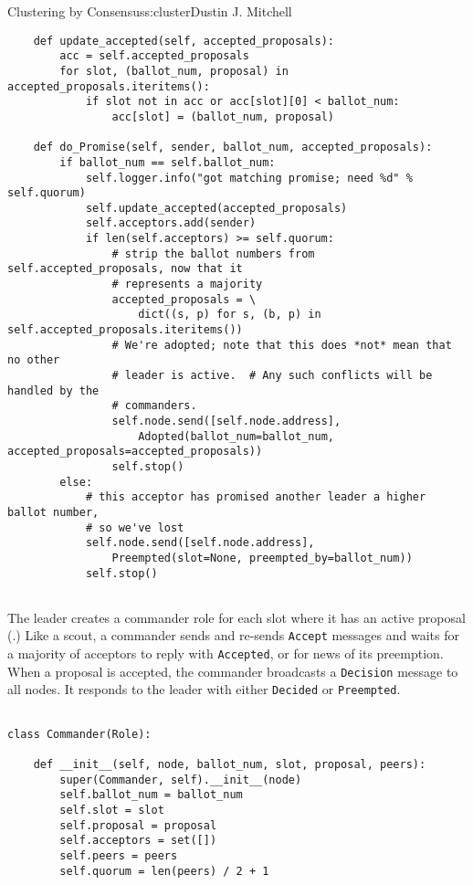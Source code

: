 \begin{aosachapter}{Clustering by Consensus}{s:cluster}{Dustin J. Mitchell}
\begin{verbatim}
    def update_accepted(self, accepted_proposals):
        acc = self.accepted_proposals
        for slot, (ballot_num, proposal) in accepted_proposals.iteritems():
            if slot not in acc or acc[slot][0] < ballot_num:
                acc[slot] = (ballot_num, proposal)

    def do_Promise(self, sender, ballot_num, accepted_proposals):
        if ballot_num == self.ballot_num:
            self.logger.info("got matching promise; need %d" % self.quorum)
            self.update_accepted(accepted_proposals)
            self.acceptors.add(sender)
            if len(self.acceptors) >= self.quorum:
                # strip the ballot numbers from self.accepted_proposals, now that it
                # represents a majority
                accepted_proposals = \ 
                    dict((s, p) for s, (b, p) in self.accepted_proposals.iteritems())
                # We're adopted; note that this does *not* mean that no other
                # leader is active.  # Any such conflicts will be handled by the
                # commanders.
                self.node.send([self.node.address],
                    Adopted(ballot_num=ballot_num, accepted_proposals=accepted_proposals))
                self.stop()
        else:
            # this acceptor has promised another leader a higher ballot number,
            # so we've lost
            self.node.send([self.node.address], 
                Preempted(slot=None, preempted_by=ballot_num))
            self.stop()
    
\end{verbatim}

The leader creates a commander role for each slot where it has an active
proposal (\aosafigref{500l.cluster.leadercommander}.) Like a scout, a
commander sends and re-sends \texttt{Accept} messages and waits for a
majority of acceptors to reply with \texttt{Accepted}, or for news of
its preemption. When a proposal is accepted, the commander broadcasts a
\texttt{Decision} message to all nodes. It responds to the leader with
either \texttt{Decided} or \texttt{Preempted}.


\begin{verbatim}

class Commander(Role):

    def __init__(self, node, ballot_num, slot, proposal, peers):
        super(Commander, self).__init__(node)
        self.ballot_num = ballot_num
        self.slot = slot
        self.proposal = proposal
        self.acceptors = set([])
        self.peers = peers
        self.quorum = len(peers) / 2 + 1


\end{verbatim}
\end{aosachapter}

